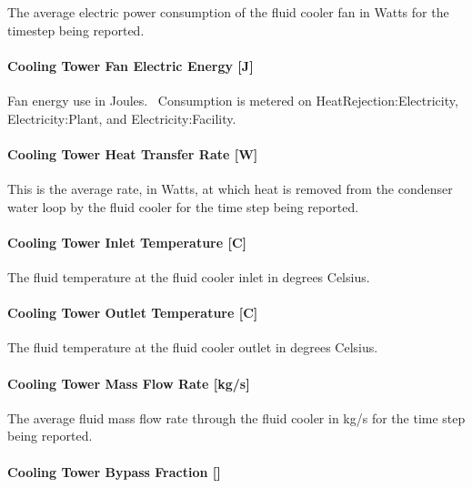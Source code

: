 The average electric power consumption of the fluid cooler fan in Watts for the timestep being reported.

\paragraph{Cooling Tower Fan Electric Energy {[}J{]}}\label{cooling-tower-fan-electric-energy-j-4}

Fan energy use in Joules.~ Consumption is metered on HeatRejection:Electricity, Electricity:Plant, and Electricity:Facility.

\paragraph{Cooling Tower Heat Transfer Rate {[}W{]}}\label{cooling-tower-heat-transfer-rate-w-4}

This is the average rate, in Watts, at which heat is removed from the condenser water loop by the fluid cooler for the time step being reported.

\paragraph{Cooling Tower Inlet Temperature {[}C{]}}\label{cooling-tower-inlet-temperature-c-4}

The fluid temperature at the fluid cooler inlet in degrees Celsius.

\paragraph{Cooling Tower Outlet Temperature {[}C{]}}\label{cooling-tower-outlet-temperature-c-4}

The fluid temperature at the fluid cooler outlet in degrees Celsius.

\paragraph{Cooling Tower Mass Flow Rate {[}kg/s{]}}\label{cooling-tower-mass-flow-rate-kgs-4}

The average fluid mass flow rate through the fluid cooler in kg/s for the time step being reported.

\paragraph{Cooling Tower Bypass Fraction {[]}}\label{cooling-tower-bypass-fraction-1}


